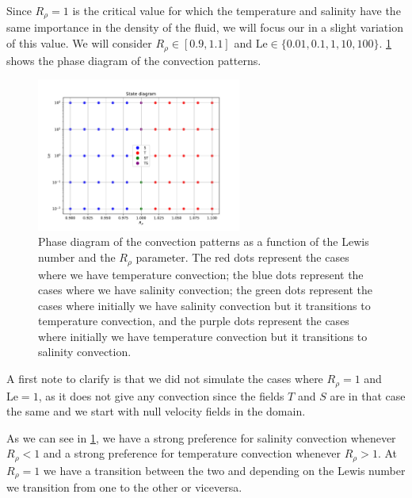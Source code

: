\documentclass{article}
\def\Le{\mathrm{Le}}
\begin{document}
Since $R_\rho=1$ is the critical value for which the temperature and salinity have the same importance in the density of the fluid, we will focus our in a slight variation of this value. We will consider $R_\rho \in [0.9,1.1]$ and $\Le\in \{0.01, 0.1, 1, 10, 100\}$. \cref{fig:phase_diagram} shows the phase diagram of the convection patterns.

\begin{figure}[ht]
  \centering
  \includegraphics[width=0.6\textwidth]{images/phase_diagram.pdf}
  \caption{Phase diagram of the convection patterns as a function of the Lewis number and the $R_{\rho}$ parameter. The red dots represent the cases where we have temperature convection; the blue dots represent the cases where we have salinity convection; the green dots represent the cases where initially we have salinity convection but it transitions to temperature convection, and the purple dots represent the cases where initially we have temperature convection but it transitions to salinity convection.}
  \label{fig:phase_diagram}
\end{figure}

A first note to clarify is that we did not simulate the cases where $R_\rho=1$ and $\Le=1$, as it does not give any convection since the fields $T$ and $S$ are in that case the same and we start with null velocity fields in the domain.

As we can see in \cref{fig:phase_diagram}, we have a strong preference for salinity convection whenever $R_\rho<1$ and a strong preference for temperature convection whenever $R_\rho>1$. At $R_\rho=1$ we have a transition between the two and depending on the Lewis number we transition from one to the other or viceversa.
\end{document}
